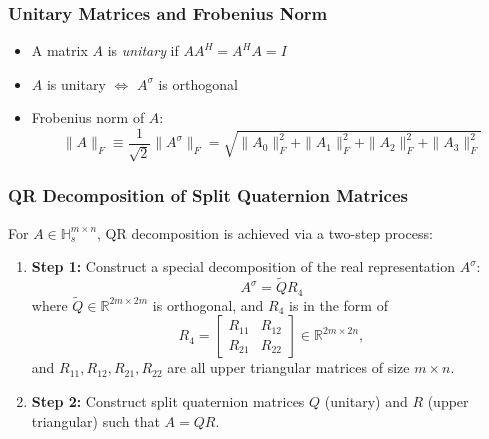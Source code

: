 \documentclass{beamer}
\begin{document}
\begin{frame}
    \frametitle{Unitary Matrices and Frobenius Norm}
    \begin{itemize}
        \item A matrix \(A\) is \textit{unitary} if \(AA^H = A^H A = I\)
        \item \(A\) is unitary \(\iff\) \(A^\sigma\) is orthogonal
        \item Frobenius norm of \(A\):
        \[
        \|A\|_F \equiv \frac{1}{\sqrt{2}} \|A^\sigma\|_F = \sqrt{\|A_0\|_F^2 + \|A_1\|_F^2 + \|A_2\|_F^2 + \|A_3\|_F^2}
        \]
    \end{itemize}
\end{frame}



\begin{frame}
    \frametitle{QR Decomposition of Split Quaternion Matrices}
    For \( A \in \mathbb{H}_s^{m \times n} \), QR decomposition is achieved via a two-step process:
    \begin{enumerate}
        \item \textbf{Step 1:} Construct a special decomposition of the real representation \( A^\sigma \):
        \[
        A^\sigma = \widetilde{Q} R_4
        \]
        where \( \widetilde{Q} \in \mathbb{R}^{2m \times 2m} \) is orthogonal, and \( R_4 \) is in the form of 
\begin{equation}\label{r4}
R_4 = \begin{bmatrix}
    R_{11} & R_{12} \\
    R_{21} & R_{22}
\end{bmatrix} \in \mathbb{R}^{2m \times 2n},
\end{equation}
and $R_{11}, R_{12},R_{21},R_{22}$ are all upper triangular matrices of size $m \times n$.
        \item \textbf{Step 2:} Construct split quaternion matrices \( Q \) (unitary) and \( R \) (upper triangular) such that \( A = QR \).
    \end{enumerate}
\end{frame}
\end{document}
